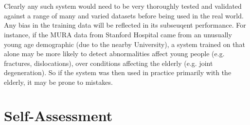 \documentclass[11pt]{article} %
\theoremstyle{plain}
\theoremstyle{definition}
\begin{document}
\\
\\
\noindent
Clearly any such system would need to be very thoroughly tested and validated against a range of many and varied datasets before being used in the real world. Any bias in the training data will be reflected in its subseuqent performance. For instance, if the MURA data from Stanford Hospital came from an unusually young age demographic (due to the nearby University), a system trained on that alone may be more likely to detect abnormalities affect young people (e.g. fractures, dislocations), over conditions affecting the elderly (e.g. joint degeneration). So if the system was then used in practice primarily with the elderly, it may be prone to mistakes.


\newpage
\section{Self-Assessment}
\end{document}
